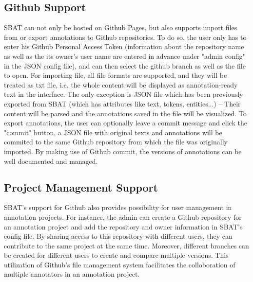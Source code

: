 \documentclass[a4paper]{article}
\begin{document}
\subsection{Github Support}
SBAT can not only be hosted on Github Pages, but also supports import files from or export annotations to Github repositories. To do so, the user only has to enter his Github Personal Access Token (information about the repository name as well as the its owner's user name are entered in advance under "admin config" in the JSON config file), and can then select the github branch as well as the file to open. For importing file, all file formats are supported, and they will be treated as txt file, i.e. the whole content will be displayed as annotation-ready text in the interface. The only exception is JSON file which has been previously exported from SBAT (which has attributes like text, tokens, entities...) -- Their content will be parsed and the annotations saved in the file will be visualized. To export annotations, the user can optionally leave a commit message and click the "commit" button, a JSON file with original texts and annotations will be commited to the same Github repository from which the file was originally imported. By making use of Github commit, the versions of annotations can be well documented and managed.
\subsection{Project Management Support}
SBAT's support for Github also provides possibility for user management in annotation projects. For instance, the admin can create a Github repository for an annotation project and add the repository and owner information in SBAT's config file. By sharing access to this repository with different users, they can contribute to the same project at the same time. Moreover, different branches can be created for different users to create and compare multiple versions. This utilization of Github's file management system facilitates the colloboration of multiple annotators in an annotation project.
\end{document}
